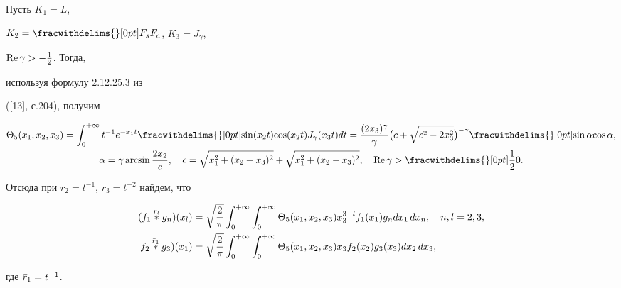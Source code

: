 \begin{exam}


Пусть $K_1=L$,


$K_2=\fracwithdelims\{\}[0pt]{F_s}{F_c}$, $K_3=J_\gamma$,


$\operatorname{Re}\gamma>-\frac{1}{2}$. Тогда,


используя формулу 2.12.25.3 из


([13], с.204), получим


\begin{gather*}


\Theta_5(x_1,x_2,x_3)=\int^{+\infty}_0 t^{-1}e^{-x_1t}


\fracwithdelims\{\}[0pt]{\sin(x_2t)}{\cos(x_2t)} J_\gamma(x_3t)dt=


\frac{(2x_3)^\gamma}{\gamma}\bigl(c+\sqrt{c^2-2x^2_3}\bigr)^{-\gamma}


\fracwithdelims\{\}[0pt]{\sin\alpha}{\cos\alpha},\\


\alpha=\gamma\arcsin\frac{2x_2}{c},\quad


c=\sqrt{x^2_1+(x_2+x_3)^2}+\sqrt{x^2_1+(x_2-x_3)^2},\quad


\re\gamma>\fracwithdelims\{\}[0pt]{\frac{1}{2}}{0}.


\end{gather*}


Отсюда при $r_2=t^{-1}$, $r_3=t^{-2}$ найдем, что


\begin{align*}


(f_1\up{r_l}{}g_n)(x_l)&= \sqrt{\frac{2}{\pi}}\int^{+\infty}_0


\int^{+\infty}_0 \Theta_5(x_1,x_2,x_3)x^{3-l}_3f_1(x_1)g_n


dx_1\,dx_n,\quad n,l=2,3,\\


f_2\up{\Bar r_1}{}g_3)(x_1)&=\sqrt{\frac{2}{\pi}}\int^{+\infty}_0


\int^{+\infty}_0 \Theta_5(x_1,x_2,x_3)x_3f_2(x_2)g_3(x_3)


dx_2\,dx_3,


\end{align*}


где $\Bar r_1=t^{-1}$.


\end{exam}





